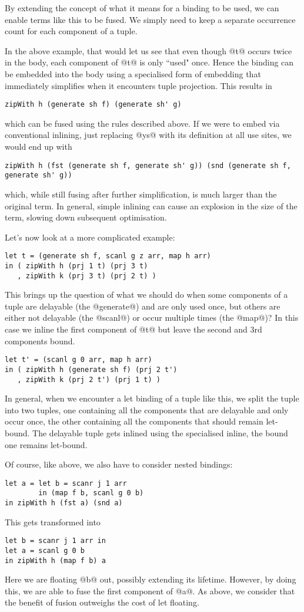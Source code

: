By extending the concept of what it means for a binding to be used, we can enable terms like this to be fused. We simply need to keep a separate occurrence count for each component of a tuple.

In the above example, that would let us see that even though @t@ occurs twice in the body, each component of @t@ is only ``used" once. Hence the binding can be embedded into the body using a specialised form of embedding that immediately simplifies when it encounters tuple projection. This results in
%
\begin{lstlisting}
zipWith h (generate sh f) (generate sh' g)
\end{lstlisting}
%
which can be fused using the rules described above. If we were to embed via conventional inlining, just replacing @ys@ with its definition at all use sites, we would end up with
%
\begin{lstlisting}
zipWith h (fst (generate sh f, generate sh' g)) (snd (generate sh f, generate sh' g))
\end{lstlisting}
%
which, while still fusing after further simplification, is much larger than the original term. In general, simple inlining can cause an explosion in the size of the term, slowing down subsequent optimisation.

Let's now look at a more complicated example:
%
\begin{lstlisting}
let t = (generate sh f, scanl g z arr, map h arr)
in ( zipWith h (prj 1 t) (prj 3 t)
   , zipWith k (prj 3 t) (prj 2 t) )
\end{lstlisting}
%
This brings up the question of what we should do when some components of a tuple are delayable (the @generate@) and are only used once, but others are either not delayable (the @scanl@) or occur multiple times (the @map@)? In this case we inline the first component of @t@ but leave the second and 3rd components bound.
%
\begin{lstlisting}
let t' = (scanl g 0 arr, map h arr)
in ( zipWith h (generate sh f) (prj 2 t')
   , zipWith k (prj 2 t') (prj 1 t) )
\end{lstlisting}
%
In general, when we encounter a let binding of a tuple like this, we split the tuple into two tuples, one containing all the components that are delayable and only occur once, the other containing all the components that should remain let-bound. The delayable tuple gets inlined using the specialised inline, the bound one remains let-bound.

Of course, like above, we also have to consider nested bindings:
%
\begin{lstlisting}
let a = let b = scanr j 1 arr
        in (map f b, scanl g 0 b)
in zipWith h (fst a) (snd a)
\end{lstlisting}
%
This gets transformed into
%
\begin{lstlisting}
let b = scanr j 1 arr in
let a = scanl g 0 b
in zipWith h (map f b) a
\end{lstlisting}
%
Here we are floating @b@ out, possibly extending its lifetime. However, by doing this, we are able to fuse the first component of @a@. As above, we consider that the benefit of fusion outweighs the cost of let floating.

